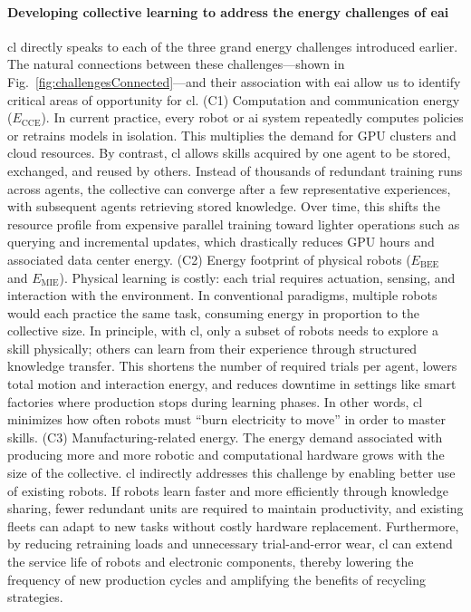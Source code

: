 \documentclass[12pt]{article}
\begin{document}
\paragraph*{Developing collective learning to address the energy challenges of \acl{eai}}

\Acl{cl} directly speaks to each of the three grand energy challenges introduced earlier. The natural connections between these challenges---shown in Fig.~\ref{fig:challengesConnected}---and their association with \ac{eai} allow us to identify critical areas of opportunity for \ac{cl}.
\newline
(C1) Computation and communication energy ($E_\text{CCE}$).
In current practice, every robot or \ac{ai} system repeatedly computes policies or retrains models in isolation. This multiplies the demand for GPU clusters and cloud resources. By contrast, \ac{cl} allows skills acquired by one agent to be stored, exchanged, and reused by others. Instead of thousands of redundant training runs across agents, the collective can converge after a few representative experiences, with subsequent agents retrieving stored knowledge. Over time, this shifts the resource profile from expensive parallel training toward lighter operations such as querying and incremental updates, which drastically reduces GPU hours and associated data center energy.
\newline
(C2) Energy footprint of physical robots ($E_\text{BEE}$ and $E_\text{MIE}$).
Physical learning is costly: each trial requires actuation, sensing, and interaction with the environment. In conventional paradigms, multiple robots would each practice the same task, consuming energy in proportion to the collective size. In principle, with \ac{cl}, only a subset of robots needs to explore a skill physically; others can learn from their experience through structured knowledge transfer. This shortens the number of required trials per agent, lowers total motion and interaction energy, and reduces downtime in settings like smart factories where production stops during learning phases. In other words, \ac{cl} minimizes how often robots must ``burn electricity to move'' in order to master skills.
\newline
(C3) Manufacturing-related energy.
The energy demand associated with producing more and more robotic and computational hardware grows with the size of the collective. \ac{cl} indirectly addresses this challenge by enabling better use of existing robots. If robots learn faster and more efficiently through knowledge sharing, fewer redundant units are required to maintain productivity, and existing fleets can adapt to new tasks without costly hardware replacement. Furthermore, by reducing retraining loads and unnecessary trial-and-error wear, \ac{cl} can extend the service life of robots and electronic components, thereby lowering the frequency of new production cycles and amplifying the benefits of recycling strategies.
\end{document}
